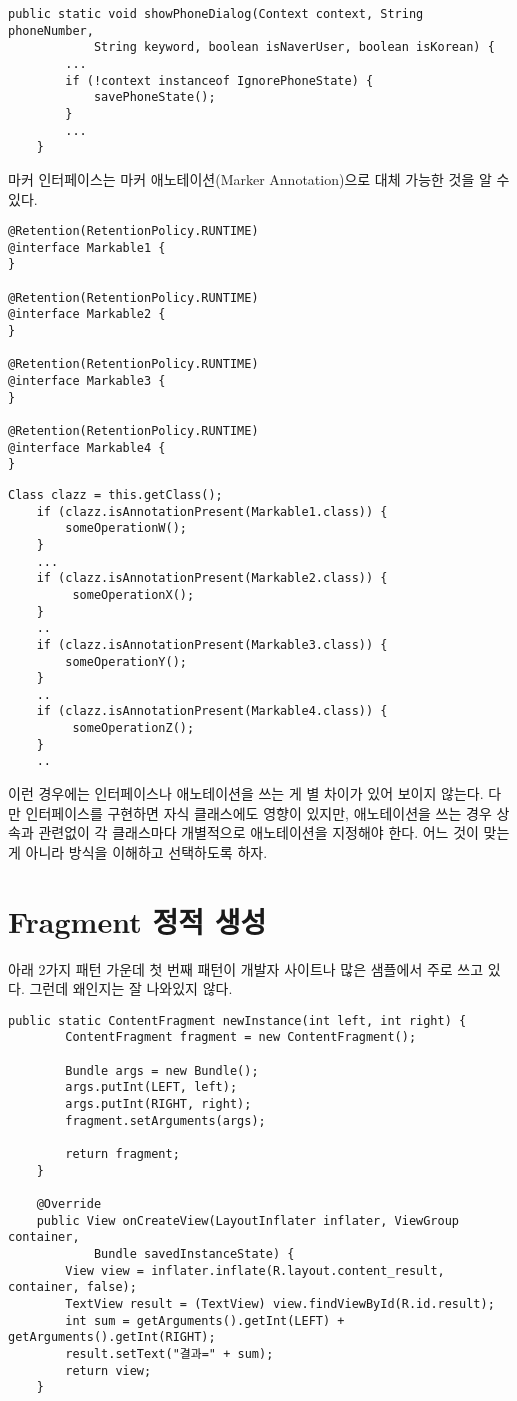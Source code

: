 \begin{lstlisting}[frame=single]
	public static void showPhoneDialog(Context context, String phoneNumber, 
			String keyword, boolean isNaverUser, boolean isKorean) {
		...
		if (!context instanceof IgnorePhoneState) {
			savePhoneState();
		}
		...
	}
\end{lstlisting}	
	
마커 인터페이스는 마커 애노테이션(Marker Annotation)으로 대체 가능한 것을 알 수 있다.

\begin{lstlisting}[frame=single]
@Retention(RetentionPolicy.RUNTIME)
@interface Markable1 {
}

@Retention(RetentionPolicy.RUNTIME)
@interface Markable2 {
}

@Retention(RetentionPolicy.RUNTIME)
@interface Markable3 {
}

@Retention(RetentionPolicy.RUNTIME)
@interface Markable4 {
}
\end{lstlisting}

\begin{lstlisting}[frame=single]
	Class clazz = this.getClass();
	if (clazz.isAnnotationPresent(Markable1.class)) {
		someOperationW();	
	}
 	...
	if (clazz.isAnnotationPresent(Markable2.class)) {
		 someOperationX();
	}
	..
	if (clazz.isAnnotationPresent(Markable3.class)) {
		someOperationY();
	} 
	..
	if (clazz.isAnnotationPresent(Markable4.class)) {
		 someOperationZ();
	}
	..
\end{lstlisting}

이런 경우에는 인터페이스나 애노테이션을 쓰는 게 별 차이가 있어 보이지 않는다. 다만 인터페이스를 구현하면 자식 클래스에도 영향이 있지만, 애노테이션을 쓰는 경우 상속과 관련없이 각 클래스마다 개별적으로 애노테이션을 지정해야 한다. 어느 것이 맞는 게 아니라 방식을 이해하고 선택하도록 하자.

\section{Fragment 정적 생성}
아래 2가지 패턴 가운데 첫 번째 패턴이 개발자 사이트나 많은 샘플에서 주로 쓰고 있다. 그런데 왜인지는 잘 나와있지 않다.
\begin{lstlisting}[frame=single]
   public static ContentFragment newInstance(int left, int right) {
        ContentFragment fragment = new ContentFragment();

        Bundle args = new Bundle();
        args.putInt(LEFT, left);
        args.putInt(RIGHT, right);
        fragment.setArguments(args);

        return fragment;
    }

    @Override
    public View onCreateView(LayoutInflater inflater, ViewGroup container, 
    		Bundle savedInstanceState) {
        View view = inflater.inflate(R.layout.content_result, container, false);
        TextView result = (TextView) view.findViewById(R.id.result);
        int sum = getArguments().getInt(LEFT) + getArguments().getInt(RIGHT);
        result.setText("결과=" + sum);
        return view;
    }
\end{lstlisting}

